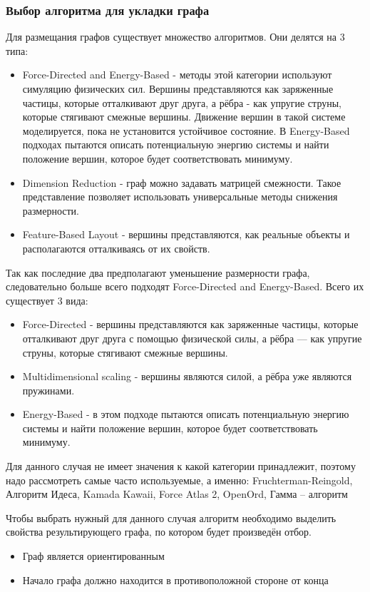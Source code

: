 \def\notedate{2022.11.29}
\def\currentauthor{Журавлев Н. (РК6-72Б)}
\subsubsection{Выбор алгоритма для укладки графа}
Для размещания графов существует множество алгоритмов. Они делятся на 3 типа:
\begin{itemize}
\item Force-Directed and Energy-Based - методы этой категории используют симуляцию физических сил. Вершины представляются как заряженные частицы, которые отталкивают друг друга, а рёбра - как упругие струны, которые стягивают смежные вершины. Движение вершин в такой системе моделируется, пока не установится устойчивое состояние. В Energy-Based подходах пытаются описать потенциальную энергию системы и найти положение вершин, которое будет соответствовать минимуму.
\item Dimension Reduction - граф можно задавать матрицей смежности. Такое представление позволяет использовать универсальные методы снижения размерности.
\item Feature-Based Layout - вершины представляются, как реальные объекты и располагаются отталкиваясь от их свойств.
\end{itemize}
Так как последние два предполагают уменьшение размерности графа, следовательно больше всего подходят Force-Directed and Energy-Based. Всего их существует 3 вида:
\begin{itemize}
\item Force-Directed - вершины представляются как заряженные частицы, которые отталкивают друг друга с помощью физической силы, а рёбра — как упругие струны, которые стягивают смежные вершины. 
\item Multidimensional scaling - вершины являются силой, а рёбра уже являются пружинами.
\item Energy-Based - в этом подходе пытаются описать потенциальную энергию системы и найти положение вершин, которое будет соответствовать минимуму.
\end{itemize}

Для данного случая не имеет значения к какой категории принадлежит, поэтому надо рассмотреть самые часто используемые, а именно: Fruchterman-Reingold, Алгоритм Идеса, Kamada Kawaii, Force Atlas 2, OpenOrd, Гамма – алгоритм

Чтобы выбрать нужный для данного случая алгоритм необходимо выделить свойства результирующего графа, по котором будет произведён отбор.
\begin{itemize}
\item Граф является ориентированным
\item Начало графа должно находится в противоположной стороне от конца
\end{itemize}

